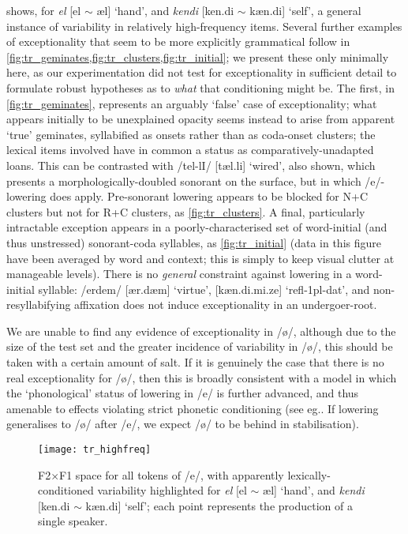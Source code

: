  shows, for \emph{el} [el $\sim$ \ae l] `hand', and \emph{kendi} [ken.di $\sim$ k\ae n.di] `self', a general instance of variability in relatively high-frequency items. Several further examples of exceptionality that seem to be more explicitly grammatical follow in \cref{fig:tr_geminates,fig:tr_clusters,fig:tr_initial}; we present these only minimally here, as our experimentation did not test for exceptionality in sufficient detail to formulate robust hypotheses as to \emph{what} that conditioning might be. The first, in \cref{fig:tr_geminates}, represents an arguably `false' case of exceptionality; what appears initially to be unexplained opacity seems instead to arise from apparent `true' geminates, syllabified as onsets rather than as coda-onset clusters; the lexical items involved have in common a status as comparatively-unadapted loans. This can be contrasted with /tel-lI/ [t\ae l.li] `wired', also shown, which presents a morphologically-doubled sonorant on the surface, but in which /e/-lowering does apply. Pre-sonorant lowering appears to be blocked for N+C clusters but not for R+C clusters, as \cref{fig:tr_clusters}. A final, particularly intractable exception appears in a poorly-characterised set of word-initial (and thus unstressed) sonorant-coda syllables, as \cref{fig:tr_initial} (data in this figure have been averaged by word and context; this is simply to keep visual clutter at manageable levels). There is no \emph{general} constraint against lowering in a word-initial syllable: /erdem/ [\ae r.d\ae m] `virtue', [kæn.di.mi.ze] `{\sc refl-1pl-dat}', and non-resyllabifying affixation does not induce exceptionality in an undergoer-root.

We are unable to find any evidence of exceptionality in /ø/, although due to the size of the test set and the greater incidence of variability in /ø/, this should be taken with a certain amount of salt. If it is genuinely the case that there is no real exceptionality for /ø/, then this is broadly consistent with a model in which the `phonological' status of lowering in /e/ is further advanced, and thus amenable to effects violating strict phonetic conditioning (see eg.\citealt{BermudezOtero2015}. If lowering generalises to /\o/ after /e/, we expect /\o/ to be behind in stabilisation).

\begin{figure}[H]
  \centering
  \texttt{[image: tr\_highfreq]}
  \caption[F2$\times$F1 space for all tokens of /e/; sporadic, lexical variability.]{F2$\times$F1 space for all tokens of /e/, with apparently lexically-conditioned variability highlighted for \emph{el} [el $\sim$ \ae l] `hand', and \emph{kendi} [ken.di $\sim$ k\ae n.di] `self'; each point represents the production of a single speaker.}
  \label{fig:highfreq}
\end{figure}

